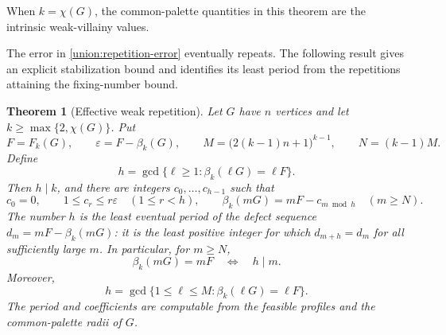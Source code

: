 \documentclass[10pt,a4paper]{amsart}
\numberwithin{equation}{section}
\newtheorem{theorem}{Theorem}[section]
\theoremstyle{definition}
\theoremstyle{remark}
\begin{document}
When $k=\chi(G)$, the common-palette quantities in this theorem
are the intrinsic weak-villainy values.

The error in \cref{union:repetition-error} eventually repeats. The
following result gives an explicit stabilization bound and identifies
its least period from the repetitions attaining the fixing-number bound.


\begin{theorem}[Effective weak repetition]\label{union:repetition-stabilization}
\label{union:repetition-periodic}
Let $G$ have $n$ vertices and let $k\ge\max\{2,\chi(G)\}$.
Put
\[
 F=F_k(G),\qquad \varepsilon=F-\beta_k(G),\qquad
 M=\bigl(2(k-1)n+1\bigr)^{k-1},\qquad N=(k-1)M.
\]
Define
\[
 h=\gcd\{\ell\ge1:\beta_k(\ell G)=\ell F\}.
\]
Then $h\mid k$, and there are integers $c_0,\ldots,c_{h-1}$ such that
\[
 c_0=0,\qquad 1\le c_r\le r\varepsilon\quad(1\le r<h),
 \qquad
 \beta_k(mG)=mF-c_{m\bmod h}\quad(m\ge N).
\]
The number $h$ is the least eventual period of the defect sequence
$d_m=mF-\beta_k(mG)$: it is the least positive integer for which
$d_{m+h}=d_m$ for all sufficiently large $m$. In particular, for $m\ge N$,
\[
 \beta_k(mG)=mF\quad\Longleftrightarrow\quad h\mid m.
\]
Moreover,
\[
 h=\gcd\{1\le\ell\le M:\beta_k(\ell G)=\ell F\}.
\]
The period and coefficients are computable from the feasible profiles
and the common-palette radii of $G$.
\end{theorem}
\end{document}
